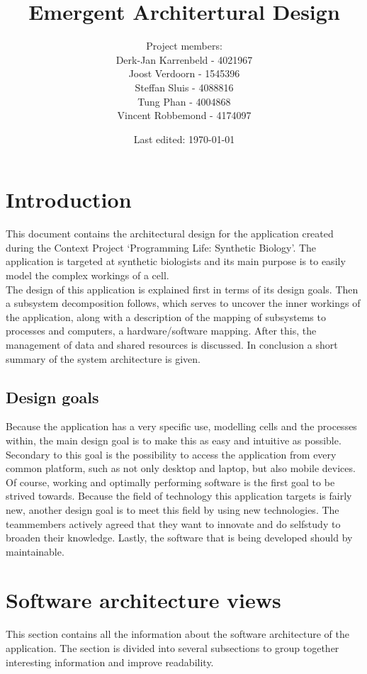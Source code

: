 \documentclass{report}
\title{Emergent Architertural Design}
\date{Last edited: \today}
\author{Project members: \\
	Derk-Jan Karrenbeld - 4021967\\
	Joost Verdoorn - 1545396\\
	Steffan Sluis - 4088816\\
	Tung Phan - 4004868\\
	Vincent Robbemond - 4174097
	}
\begin{document}
	\maketitle

	\tableofcontents

	\clearpage

	\setcounter{section}{0}
	\renewcommand*\thesection{\arabic{section}}
	
	\section{Introduction}
		This document contains the architectural design for the application created during the Context Project `Programming Life: Synthetic Biology'. The application is targeted at synthetic biologists and its main purpose is to easily model the complex workings of a cell. \\
		The design of this application is explained first in terms of its design goals. Then a subsystem decomposition follows, which serves to uncover the inner workings of the application, along with a description of the mapping of subsystems to processes and computers, a hardware/software mapping. After this, the management of data and shared resources is discussed. In conclusion a short summary of the system architecture is given.
		\subsection{Design goals}
			Because the application has a very specific use, modelling cells and the processes within, the main design goal is to make this as easy and intuitive as possible. Secondary to this goal is the possibility to access the application from every common platform, such as not only desktop and laptop, but also mobile devices. Of course, working and optimally performing software is the first goal to be strived towards.
			Because the field of technology this application targets is fairly new, another design goal is to meet this field by using new technologies. The teammembers actively agreed that they want to innovate and do selfstudy to broaden their knowledge. 
			Lastly, the software that is being developed should by maintainable. 
	\clearpage
	\section{Software architecture views}
		This section contains all the information about the software architecture of the application. The section is divided into several subsections to group together interesting information and improve readability.
\end{document}
